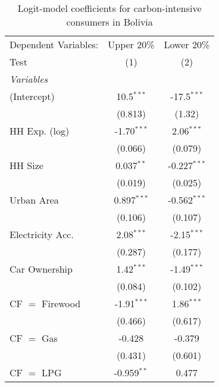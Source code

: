 
\begin{table}[htbp!]
   \centering
   \small
   \begin{adjustbox}{width = 1\textwidth, max height = 0.95\textheight, center}
      \begin{threeparttable}[b]
         \caption{\label{tab:Logit_1_BOL} Logit-model coefficients for carbon-intensive consumers in Bolivia}
         \begin{tabular}{lcc}
            \tabularnewline \midrule \midrule
            Dependent Variables: & Upper 20\%    & Lower 20\%\\   
            Test                 & (1)           & (2)\\  
            \midrule
            \emph{Variables}\\
            (Intercept)          & 10.5$^{***}$  & -17.5$^{***}$\\   
                                 & (0.813)       & (1.32)\\   
            HH Exp. (log)        & -1.70$^{***}$ & 2.06$^{***}$\\   
                                 & (0.066)       & (0.079)\\   
            HH Size              & 0.037$^{**}$  & -0.227$^{***}$\\   
                                 & (0.019)       & (0.025)\\   
            Urban Area           & 0.897$^{***}$ & -0.562$^{***}$\\   
                                 & (0.106)       & (0.107)\\   
            Electricity Acc.     & 2.08$^{***}$  & -2.15$^{***}$\\   
                                 & (0.287)       & (0.177)\\   
            Car Ownership        & 1.42$^{***}$  & -1.49$^{***}$\\   
                                 & (0.084)       & (0.102)\\   
            CF $=$ Firewood      & -1.91$^{***}$ & 1.86$^{***}$\\   
                                 & (0.466)       & (0.617)\\   
            CF $=$ Gas           & -0.428        & -0.379\\   
                                 & (0.431)       & (0.601)\\   
            CF $=$ LPG           & -0.959$^{**}$ & 0.477\\   

\end{tabular}
\end{threeparttable}
\end{adjustbox}
\end{table}
